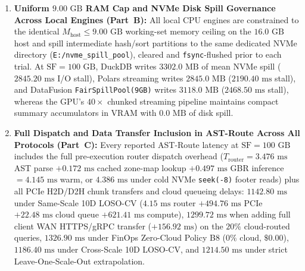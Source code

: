 \documentclass[10pt,a4paper]{article}
\begin{document}
\begin{enumerate}[leftmargin=1.5em,itemsep=0.8pt]
    \item \textbf{Uniform $9.00\text{ GB}$ RAM Cap and NVMe Disk Spill Governance Across Local Engines (Part~B):} All local CPU engines are constrained to the identical $M_{\text{host}} \le 9.00\text{ GB}$ working-set memory ceiling on the $16.0\text{ GB}$ host and spill intermediate hash/sort partitions to the same dedicated NVMe directory (\texttt{E:/nvme\_spill\_pool}), cleared and \texttt{fsync}-flushed prior to each trial. At $\text{SF}=100\text{ GB}$, DuckDB writes $3302.0\text{ MB}$ of mean NVMe spill ($2845.20\text{ ms}$ I/O stall), Polars streaming writes $2845.0\text{ MB}$ ($2190.40\text{ ms}$ stall), and DataFusion \texttt{FairSpillPool(9GB)} writes $3118.0\text{ MB}$ ($2468.50\text{ ms}$ stall), whereas the GPU's $40\times$ chunked streaming pipeline maintains compact summary accumulators in VRAM with $0.0\text{ MB}$ of disk spill.
    \item \textbf{Full Dispatch and Data Transfer Inclusion in AST-Route Across All Protocols (Part~C):} Every reported AST-Route latency at $\text{SF}=100\text{ GB}$ includes the full pre-execution router dispatch overhead ($T_{\text{router}} = 3.476\text{ ms}$ AST parse $+ 0.172\text{ ms}$ cached zone-map lookup $+ 0.497\text{ ms}$ GBR inference $= 4.145\text{ ms}$ warm, or $4.386\text{ ms}$ under cold NVMe \texttt{seek(-8)} footer reads) plus all PCIe H2D/D2H chunk transfers and cloud queueing delays: $1142.80\text{ ms}$ under Same-Scale 10D LOSO-CV ($4.15\text{ ms}$ router $+ 494.76\text{ ms}$ PCIe $+ 22.48\text{ ms}$ cloud queue $+ 621.41\text{ ms}$ compute), $1299.72\text{ ms}$ when adding full client WAN HTTPS/gRPC transfer ($+156.92\text{ ms}$) on the $20\%$ cloud-routed queries, $1326.90\text{ ms}$ under FinOps Zero-Cloud Policy B8 ($0\%$ cloud, $\$0.00$), $1186.40\text{ ms}$ under Cross-Scale 10D LOSO-CV, and $1214.50\text{ ms}$ under strict Leave-One-Scale-Out extrapolation.

\end{enumerate}
\end{document}

